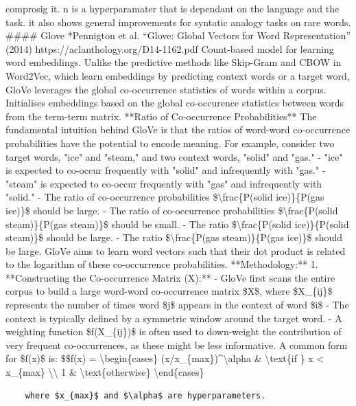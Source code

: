 \documentclass[
]{article}
\begin{document}
comprosig it. n is a hyperparamater that is dependant on the language
and the task. it also shows general improvements for syntatic analogy
tasks on rare words. \#\#\#\# Glove *Pennigton et al. ``Glove: Global
Vectors for Word Representation'' (2014)
https://aclanthology.org/D14-1162.pdf Count-based model for learning
word embeddings. Unlike the predictive methods like Skip-Gram and CBOW
in Word2Vec, which learn embeddings by predicting context words or a
target word, GloVe leverages the global co-occurrence statistics of
words within a corpus. Initialises embeddings based on the global
co-occurence statistics between words from the term-term matrix. **Ratio
of Co-occurrence Probabilities** The fundamental intuition behind GloVe
is that the ratios of word-word co-occurrence probabilities have the
potential to encode meaning. For example, consider two target words,
"ice" and "steam," and two context words, "solid" and "gas." - "ice" is
expected to co-occur frequently with "solid" and infrequently with
"gas." - "steam" is expected to co-occur frequently with "gas" and
infrequently with "solid." - The ratio of co-occurrence probabilities
\$\textbackslash frac\{P(solid \textbar{} ice)\}\{P(gas \textbar{}
ice)\}\$ should be large. - The ratio of co-occurrence probabilities
\$\textbackslash frac\{P(solid \textbar{} steam)\}\{P(gas \textbar{}
steam)\}\$ should be small. - The ratio \$\textbackslash frac\{P(solid
\textbar{} ice)\}\{P(solid \textbar{} steam)\}\$ should be large. - The
ratio \$\textbackslash frac\{P(gas \textbar{} steam)\}\{P(gas \textbar{}
ice)\}\$ should be large. GloVe aims to learn word vectors such that
their dot product is related to the logarithm of these co-occurrence
probabilities. **Methodology:** 1. **Constructing the Co-occurrence
Matrix (X):** - GloVe first scans the entire corpus to build a large
word-word co-occurrence matrix \$X\$, where \$X\_\{ij\}\$ represents the
number of times word \$j\$ appears in the context of word \$i\$ - The
context is typically defined by a symmetric window around the target
word. - A weighting function \$f(X\_\{ij\})\$ is often used to
down-weight the contribution of very frequent co-occurrences, as these
might be less informative. A common form for \$f(x)\$ is: \$\$f(x) =
\textbackslash begin\{cases\} (x/x\_\{max\})\^{}\textbackslash alpha \&
\textbackslash text\{if \} x \textless{} x\_\{max\}
\textbackslash\textbackslash{} 1 \& \textbackslash text\{otherwise\}
\textbackslash end\{cases\}

\begin{verbatim}
    where $x_{max}$ and $\alpha$ are hyperparameters.
\end{verbatim}
\end{document}
